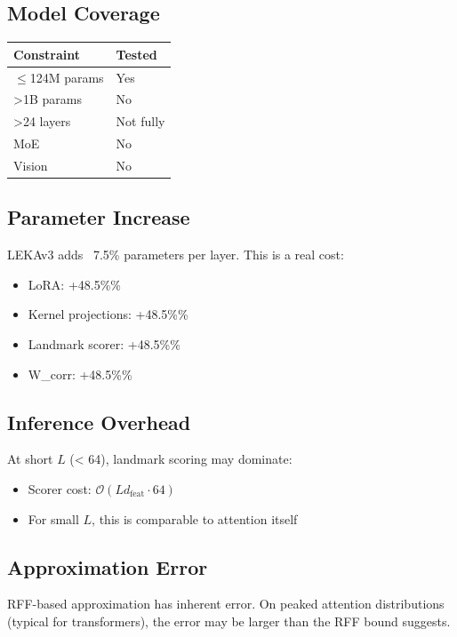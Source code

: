 \subsection{Model Coverage}

\begin{table}[H]
\centering
\small
\begin{tabular}{ll}
\toprule
\textbf{Constraint} & \textbf{Tested} \\
\midrule
$\le$124M params & Yes \\
\textgreater{}1B params & No \\
\textgreater{}24 layers & Not fully \\
MoE & No \\
Vision & No \\
\bottomrule
\end{tabular}
\end{table}

\subsection{Parameter Increase}

LEKAv3 adds ~7.5\% parameters per layer. This is a real cost:
\begin{itemize}
\item LoRA: +48.5\%\%
\item Kernel projections: +48.5\%\%
\item Landmark scorer: +48.5\%\%
\item W\_corr: +48.5\%\%

\end{itemize}
\subsection{Inference Overhead}

At short $L$ (\textless{} 64), landmark scoring may dominate:
\begin{itemize}
\item Scorer cost: $\mathcal{O}(L d_\text{feat} \cdot 64)$
\item For small $L$, this is comparable to attention itself

\end{itemize}
\subsection{Approximation Error}

RFF-based approximation has inherent error. On peaked attention 
distributions (typical for transformers), the error may be larger than 
the RFF bound suggests.

